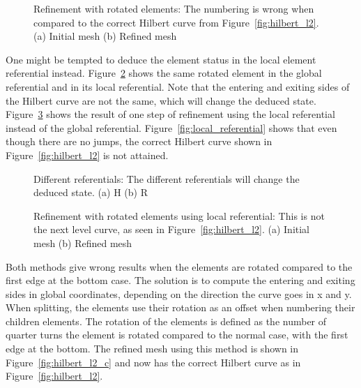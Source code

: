 \begin{figure}[H]
	\centering
	\hfill
	\caption{Refinement with rotated elements: The numbering is wrong when compared to the correct Hilbert curve from Figure~\ref{fig:hilbert_l2}. (a) Initial mesh (b) Refined mesh}\label{fig:hilbert_rotated}
\end{figure}

One might be tempted to deduce the element status in the local element referential instead.
Figure~\ref{fig:referentials} shows the same rotated element in the global referential and in its
local referential. Note that the entering and exiting sides of the Hilbert curve are not the same,
which will change the deduced state. Figure~\ref{fig:hilbert_local} shows the result of one step of
refinement using the local referential instead of the global referential.
Figure~\ref{fig:local_referential} shows that even though there are no jumps, the correct Hilbert
curve shown in Figure~\ref{fig:hilbert_l2} is not attained.

\begin{figure}[H]
	\centering
	\hfill
	\caption{Different referentials: The different referentials will change the deduced state. (a) H (b) R}\label{fig:referentials}
\end{figure}

\begin{figure}[H]
	\centering
	\hfill
	\caption{Refinement with rotated elements using local referential: This is not the next level curve, as seen in Figure~\ref{fig:hilbert_l2}. (a) Initial mesh (b) Refined mesh}\label{fig:hilbert_local}
\end{figure}

Both methods give wrong results when the elements are rotated compared to the first edge at the
bottom case. The solution is to compute the entering and exiting sides in global coordinates,
depending on the direction the curve goes in x and y. When splitting, the elements use their
rotation as an offset when numbering their children elements. The rotation of the elements is
defined as the number of quarter turns the element is rotated compared to the normal case, with the
first edge at the bottom. The refined mesh using this method is shown in
Figure~\ref{fig:hilbert_l2_c} and now has the correct Hilbert curve as in
Figure~\ref{fig:hilbert_l2}.

